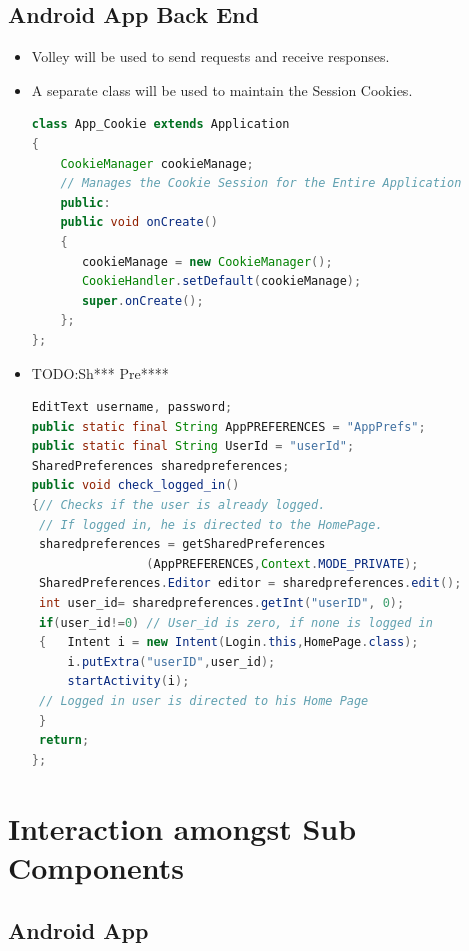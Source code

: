 \documentclass{article}
\begin{document}
		\subsection{Android App Back End}
		\begin{itemize}
		\item Volley will be used to send requests and receive responses.
		\item A separate class will be used to maintain the Session Cookies.
		\begin{lstlisting}[language=Java, caption={App\_Cookie Class}]
class App_Cookie extends Application
{	
   	CookieManager cookieManage;
   	// Manages the Cookie Session for the Entire Application
	public:
 	public void onCreate() 
	{
       cookieManage = new CookieManager();
       CookieHandler.setDefault(cookieManage);
       super.onCreate();
   	};
};
		\end{lstlisting}

		\item TODO:Sh*** Pre****
\begin{lstlisting}[language=Java, caption={Persistent Login}]
EditText username, password;
public static final String AppPREFERENCES = "AppPrefs";
public static final String UserId = "userId";
SharedPreferences sharedpreferences;
public void check_logged_in()
{// Checks if the user is already logged.
 // If logged in, he is directed to the HomePage. 
 sharedpreferences = getSharedPreferences
				(AppPREFERENCES,Context.MODE_PRIVATE);
 SharedPreferences.Editor editor = sharedpreferences.edit();
 int user_id= sharedpreferences.getInt("userID", 0);
 if(user_id!=0) // User_id is zero, if none is logged in
 {   Intent i = new Intent(Login.this,HomePage.class);
     i.putExtra("userID",user_id);
     startActivity(i);
 // Logged in user is directed to his Home Page
 }
 return;
};
		\end{lstlisting}		
		\end{itemize}

	\section{Interaction amongst Sub Components}
			\subsection{Android App}
\end{document}
